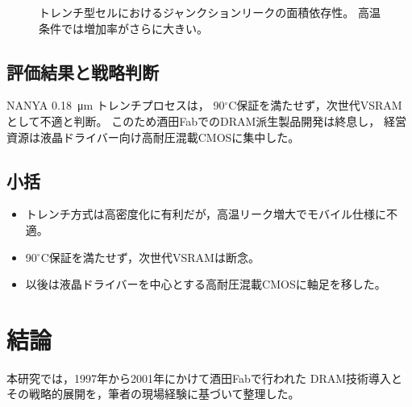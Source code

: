 \documentclass[conference]{IEEEtran}
\let\meter\metre
\begin{document}
\begin{figure}[t]
\centering
{}
\caption{トレンチ型セルにおけるジャンクションリークの面積依存性。
高温条件では増加率がさらに大きい。}
\label{fig:trench_leak}
\end{figure}

\subsection{評価結果と戦略判断}
NANYA \SI{0.18}{\micro\meter} トレンチプロセスは，
90$^\circ$C保証を満たせず，次世代VSRAMとして不適と判断。
このため酒田FabでのDRAM派生製品開発は終息し，
経営資源は液晶ドライバー向け高耐圧混載CMOSに集中した。

\subsection{小括}
\begin{itemize}
  \item トレンチ方式は高密度化に有利だが，高温リーク増大でモバイル仕様に不適。
  \item 90$^\circ$C保証を満たせず，次世代VSRAMは断念。
  \item 以後は液晶ドライバーを中心とする高耐圧混載CMOSに軸足を移した。
\end{itemize}

\section{結論}

本研究では，1997年から2001年にかけて酒田Fabで行われた
DRAM技術導入とその戦略的展開を，筆者の現場経験に基づいて整理した。
\end{document}

